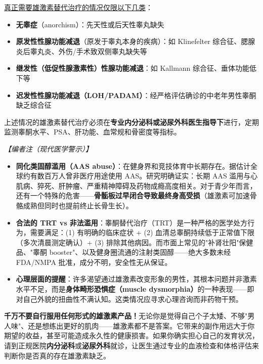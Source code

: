\documentclass[12pt,a4paper,twoside]{ctexbook}
\begin{document}
\vspace{0.3em}
\underline{真正需要雄激素替代治疗的情况仅限以下几类}：
\begin{itemize}
	\item \textbf{无睾症}（anorchism）：先天性或后天性睾丸缺失
	\item \textbf{原发性性腺功能减退}（原发于睾丸本身的疾病）：如 Klinefelter 综合征、腮腺炎后睾丸炎、外伤/手术致双侧睾丸缺失等
	\item \textbf{继发性（低促性腺激素性）性腺功能减退}：如 Kallmann 综合征、垂体功能低下等
	\item \textbf{迟发性性腺功能减退（LOH/PADAM）}：经严格评估确诊的中老年男性睾酮缺乏综合征
\end{itemize}

上述情况的雄激素替代治疗必须在\textbf{专业内分泌科或泌尿外科医生指导下}进行，定期监测睾酮水平、PSA、肝功能、血常规和骨密度等指标。

\vspace{0.5em}
\noindent\textit{【编者注（现代医学警示）】}
\begin{itemize}
	\item \textbf{同化类固醇滥用（AAS abuse）}：在健身界和竞技体育中长期存在。据估计全球约有数百万人曾非医疗用途使用 AAS。研究明确证实：长期 AAS 滥用与心肌病、猝死、肝肿瘤、严重精神障碍及药物成瘾高度相关。对于青少年而言，还有一个特殊的危害——\textbf{骨骺板过早闭合导致最终身高受损}（雄激素可加速骨骼成熟但同时也提前终止长骨生长）。
	\item \textbf{合法的 TRT vs 非法滥用}：睾酮替代治疗（TRT）是一种严格的医学处方行为，需要满足：(1) 有明确的临床症状 + (2) 血清总睾酮持续低于正常值下限（多次清晨测定确认）+ (3) 排除其他病因。而市面上常见的"补肾壮阳"保健品、"睾酮 booster"、以及健身圈流通的注射类固醇——绝大多数未经 FDA/NMPA 批准，成分不明，安全性无从保证。
	\item \textbf{心理层面的提醒}：许多渴望通过雄激素改变形象的男性，其根本问题并非激素水平不足，而是\textbf{身体畸形恐惧症（muscle dysmorphia）}的一种表现——即对自己外貌的扭曲性不满认知。这类情况应寻求心理咨询而非药物干预。
\end{itemize}

\begin{tcolorbox}[colback=pink!5!white,colframe=red!50!black,title=贴心小叮咛]
\textbf{千万不要自行服用任何形式的雄激素产品！}无论你是觉得自己个子太矮、不够"男人味"、还是想练出更好的肌肉——雄激素都不是答案。它带来的副作用远大于你期望的收益，甚至可能造成永久性的健康损害。如果你确实担心自己的发育状况，请到正规医院\textbf{内分泌科}或\textbf{泌尿外科}就诊，让医生通过专业的血液检查和体格评估来判断你是否真的存在雄激素缺乏。
\end{tcolorbox}
\end{document}
